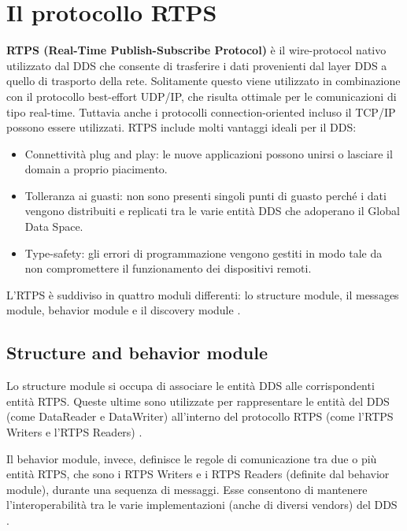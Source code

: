 \section{Il protocollo RTPS}
\textbf{RTPS (Real-Time Publish-Subscribe Protocol)} è il wire-protocol 
nativo utilizzato dal DDS che consente di trasferire i dati provenienti
dal layer DDS a quello di trasporto della rete.
Solitamente questo viene utilizzato in combinazione con il protocollo
best-effort
UDP/IP, che risulta ottimale per le comunicazioni di tipo real-time. Tuttavia 
anche i protocolli connection-oriented incluso il TCP/IP possono essere utilizzati. 
RTPS include molti vantaggi ideali per il DDS:
\begin{itemize}
    \item Connettività plug and play: le nuove applicazioni possono unirsi o 
    lasciare il domain a proprio piacimento.
    \item Tolleranza ai guasti: non sono presenti singoli punti di 
    guasto perché i dati vengono distribuiti e replicati tra le varie 
    entità DDS che adoperano il Global Data Space.
    \item Type-safety: gli errori di programmazione vengono gestiti 
    in modo tale da non compromettere il funzionamento 
    dei dispositivi remoti.
\end{itemize}
L'RTPS è suddiviso in quattro moduli differenti: lo structure module, il 
messages module, behavior module e il discovery module \cite{ddsrtps}.

\subsection{Structure and behavior module}
Lo structure module si occupa di associare le entità DDS alle corrispondenti
entità RTPS. Queste ultime sono utilizzate 
per rappresentare le entità del DDS (come DataReader e DataWriter) 
all'interno del protocollo RTPS (come l'RTPS Writers e l'RTPS Readers) 
\cite{ddsrtps}.

Il behavior module, invece, definisce le regole di comunicazione tra
due o più entità RTPS, che sono i RTPS Writers e i RTPS Readers 
(definite dal behavior module), durante 
una sequenza di messaggi.
Esse consentono di mantenere l'interoperabilità tra le varie 
implementazioni (anche di diversi vendors) del DDS \cite{ddsrtps}.

